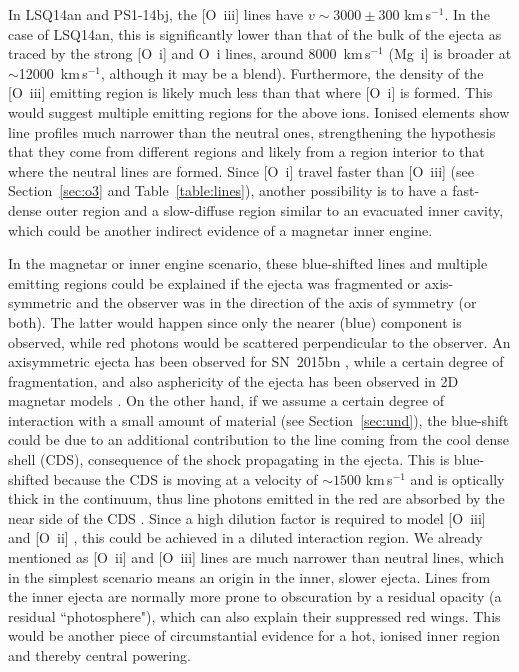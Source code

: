 \documentclass[useAMS,usenatbib]{mn2e}
\def\kms{km\,s$^{-1}$}
\def\an{LSQ14an}
\def\oiii{[O~{\sc iii}]}
\begin{document}
In \an\/ and PS1-14bj, the \oiii\/ lines have $v\sim3000\pm300$ \kms\/. 
In the case of \an, this is significantly lower than that of the bulk of the ejecta as traced by the strong [O~{\sc i}] and O~{\sc i} lines, around 8000~\kms 
(Mg~{\sc i}] is broader at $\sim$12000~\kms, although it may be a blend).
Furthermore, the density of the \oiii\/ emitting region is likely much less than that where [O~{\sc i}] is formed. This would suggest multiple emitting regions for the above ions. Ionised elements show line profiles  much narrower than the neutral ones, strengthening the hypothesis that they come from different regions and likely from a region interior to that where the neutral lines are formed. Since [O~{\sc i}] travel faster than \oiii\/ (see Section~\ref{sec:o3} and Table~\ref{table:lines}), another possibility is to have a fast-dense outer region and a slow-diffuse region similar to an evacuated inner cavity, which could be another indirect evidence of a magnetar inner engine. 

In the magnetar or inner engine scenario, these  blue-shifted lines and multiple emitting regions could be explained if the ejecta was fragmented or axis-symmetric and the observer was in the direction of the axis of symmetry (or both). The latter would happen since only the nearer (blue) component is observed, while red photons would be scattered perpendicular to the observer.
An axisymmetric ejecta has been observed for SN~2015bn \citep{in16c}, while a certain degree of fragmentation, and also asphericity of the ejecta has been observed in 2D magnetar models \citep{chen16}.
On the other hand, if we assume a certain degree of interaction with a small amount of material (see Section~\ref{sec:und}), the blue-shift could be due to an additional contribution to the line coming from the cool dense shell (CDS), consequence of the shock propagating in the ejecta. This is blue-shifted because the CDS is moving at a velocity of $\sim1500$ \kms\/ and is optically thick in the continuum, thus line photons emitted in the red are absorbed by the near side of the CDS \citep{de15}. Since a high dilution factor is required to model [O~{\sc iii}] and [O~{\sc ii}] \citep{je16}, this could be achieved in a diluted interaction region.
We already mentioned as [O~{\sc ii}] and [O~{\sc iii}] lines are much narrower than neutral lines, which in the simplest scenario means an origin in the inner, slower ejecta. Lines from the inner ejecta are normally more prone to obscuration by a residual opacity (a residual ``photosphere"), which can also explain their suppressed red wings. This would be another piece of circumstantial evidence for a hot, ionised inner region and thereby central powering.
\end{document}
